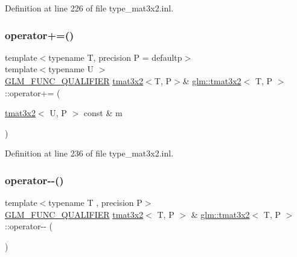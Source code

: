 Definition at line 226 of file type\+\_\+mat3x2.\+inl.

\mbox{\label{structglm_1_1tmat3x2_aab711028912b77b4658892c5a1a3a5a9}} 
\subsubsection{\texorpdfstring{operator+=()}{operator+=()}\hspace{0.1cm}{\footnotesize\ttfamily [4/4]}}
{\footnotesize\ttfamily template$<$typename T, precision P = defaultp$>$ \\
template$<$typename U $>$ \\
\mbox{\hyperlink{setup_8hpp_a33fdea6f91c5f834105f7415e2a64407}{G\+L\+M\+\_\+\+F\+U\+N\+C\+\_\+\+Q\+U\+A\+L\+I\+F\+I\+ER}} \mbox{\hyperlink{structglm_1_1tmat3x2}{tmat3x2}}$<$T, P$>$\& \mbox{\hyperlink{structglm_1_1tmat3x2}{glm\+::tmat3x2}}$<$ T, P $>$\+::operator+= (\begin{DoxyParamCaption}\item[{\mbox{\hyperlink{structglm_1_1tmat3x2}{tmat3x2}}$<$ U, P $>$ const \&}]{m }\end{DoxyParamCaption})}



Definition at line 236 of file type\+\_\+mat3x2.\+inl.

\mbox{\label{structglm_1_1tmat3x2_a655f4f20c013de86c872da9a60183b05}} 
\subsubsection{\texorpdfstring{operator-\/-\/()}{operator--()}\hspace{0.1cm}{\footnotesize\ttfamily [1/2]}}
{\footnotesize\ttfamily template$<$typename T , precision P$>$ \\
\mbox{\hyperlink{setup_8hpp_a33fdea6f91c5f834105f7415e2a64407}{G\+L\+M\+\_\+\+F\+U\+N\+C\+\_\+\+Q\+U\+A\+L\+I\+F\+I\+ER}} \mbox{\hyperlink{structglm_1_1tmat3x2}{tmat3x2}}$<$ T, P $>$ \& \mbox{\hyperlink{structglm_1_1tmat3x2}{glm\+::tmat3x2}}$<$ T, P $>$\+::operator-\/-\/ (\begin{DoxyParamCaption}{ }\end{DoxyParamCaption})}



